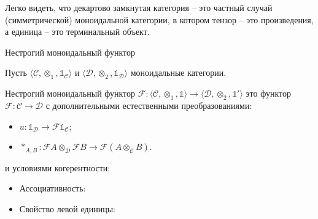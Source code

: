 Легко видеть, что декартово замкнутая категория -- это частный случай (симметрической) моноидальной категории, в котором тензор -- это произведения, а единица -- это терминальный объект.

\begin{defin} Нестрогий моноидальный функтор

  Пусть $\langle \mathcal{C}, \otimes_1, \mathds{1}_{\mathcal{C}} \rangle$ и $\langle \mathcal{D}, \otimes_2, \mathds{1}_{\mathcal{D}} \rangle$ моноидальные категории.

  Нестрогий моноидальный функтор $\mathcal{F} : \langle \mathcal{C}, \otimes_1, \mathds{1} \rangle \to \langle \mathcal{D}, \otimes_2, \mathds{1}' \rangle$ это функтор
  $\mathcal{F} : \mathcal{C} \to \mathcal{D}$ с дополнительными естественными преобразованиями:

  \begin{itemize}
  \item $u : \mathds{1}_{\mathcal{D}} \to \mathcal{F}\mathds{1}_{\mathcal{C}}$;
  \item $\ast_{A, B} : \mathcal{F}A \otimes_{\mathcal{D}} \mathcal{F}B \to \mathcal{F}(A \otimes_{\mathcal{C}} B)$.
  \end{itemize}

  и условиями когерентности:

  \begin{itemize}
    \item Ассоциативность:


    \item Свойство левой единицы:


\end{itemize}
\end{defin}
